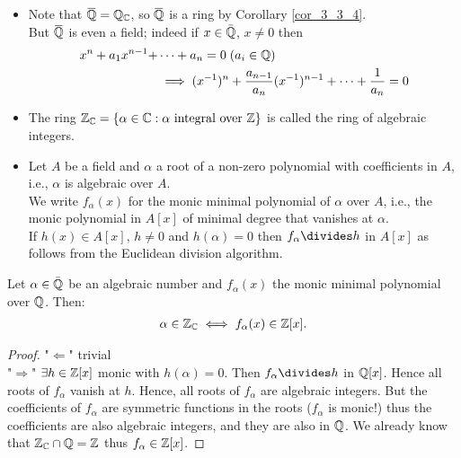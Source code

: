 \documentclass[NumTh.tex]{subfiles}
\begin{document}
\begin{rem}
  \begin{itemize}
    \item Note that $\overbar{\Q} = \Q_\C$, so $\overbar{\Q}$ is a ring by Corollary \ref{cor_3_3_4}.\\
    But $\overbar{\Q}$ is even a field; indeed if $x \in \bar{\mathbb{Q}}$, $x \neq 0$ then 
    \begin{align*}
      x^n + a_1 x^{n-1} + &\dots + a_n = 0 \; (a_i \in \mathbb{Q}) \\
      &\implies (x^{-1})^n + \frac{a_{n-1}}{a_n}(x^{-1})^{n-1} + \dots + \frac{1}{a_n} = 0 
    \end{align*}
    \item The ring $\mathbb{Z}_{\mathbb{C}} = \{ \alpha \in \mathbb{C}: \alpha \text{ integral over } \mathbb{Z} \}$ is called the ring of algebraic integers.
    \item Let $A$ be a field and $\alpha$ a root of a non-zero polynomial with coefficients in $A$,
    i.e., $\alpha$ is algebraic over $A$.\\
    We write $f_\alpha(x)$ for the monic minimal polynomial of $\alpha$ over $A$,
    i.e., the monic polynomial in $A[x]$ of minimal degree that vanishes at $\alpha$.\\
    If $h(x) \in A[x]$, $h \neq 0$ and $h(\alpha) = 0$ then $f_\alpha \divides h$ in $A[x]$ as follows from the Euclidean division algorithm.
    \end{itemize}
\end{rem}

\begin{lemma}\label{l_3_3_5}
  Let $\alpha \in \bar{\mathbb{Q}}$ be an algebraic number and $f_\alpha(x)$ the monic minimal polynomial over $\mathbb{Q}$.
  Then:
  \begin{align*}
    \alpha \in \mathbb{Z}_{\mathbb{C}} \iff f_\alpha(x) \in \mathbb{Z}[x] \text{.}
  \end{align*}
\end{lemma}

\begin{proof}
  "$\Leftarrow$" trivial\\
  "$\Rightarrow$" $\exists h \in \mathbb{Z}[x]$ monic with $h(\alpha) = 0$.
  Then $f_\alpha \divides h$ in $\mathbb{Q}[x]$.
  Hence all roots of $f_\alpha$ vanish at $h$.
  Hence, all roots of $f_\alpha$ are algebraic integers.
  But the coefficients of $f_\alpha$ are symmetric functions in the roots ($f_\alpha$ is monic!) thus the coefficients are also algebraic integers,
  and they are also in $\mathbb{Q}$.
  We already know that $\mathbb{Z}_{\mathbb{C}} \cap \mathbb{Q} = \mathbb{Z}$ thus $f_\alpha \in \mathbb{Z}[x]$.
\end{proof}
\end{document}
